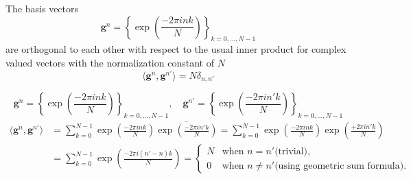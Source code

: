 \begin{Prop}\label{Prop:1ddftbasisvectors}
    The basis vectors
    \begin{equation}\label{eq:1ddftbasisvectors}
        \boldsymbol{g}^n = \left\{\exp\left({\frac{-2\pi ink}{N}}\right)\right\}_{k=0,\ldots,N-1}
    \end{equation}
    are orthogonal to each other with respect to the usual inner product for complex valued vectors 
    with the normalization constant of $N$
    \begin{equation}
        \langle\boldsymbol{g}^n,\boldsymbol{g}^{n'}\rangle= N \delta_{n,n'}
    \end{equation}
\end{Prop}

\begin{Proof}
    \begin{equation*}
        \boldsymbol{g}^n = \left\{\exp\left({\frac{-2\pi ink}{N}}\right)\right\}_{k=0,\ldots,N-1}, \quad \boldsymbol{g}^{n'} = \left\{\exp\left({\frac{-2\pi in'k}{N}}\right)\right\}_{k=0,\ldots,N-1}
    \end{equation*}
    \begin{equation*}
    \begin{split} 
        \langle\boldsymbol{g}^n,\boldsymbol{g}^{n'}\rangle &= \sum_{k=0}^{N-1} \exp\left({\frac{-2\pi ink}{N}}\right)\overline{\exp\left({\frac{-2\pi in'k}{N}}\right)}
        = \sum_{k=0}^{N-1} \exp\left({\frac{-2\pi ink}{N}}\right)\exp\left({\frac{+2\pi in'k}{N}}\right)\\
        &= \sum_{k=0}^{N-1} \exp\left({\frac{-2\pi i(n'-n)k}{N}}\right)=
        \begin{cases}
            N & \text{when $n = n'$}\text{(trivial)},\\
            0 & \text{when $n\neq n'$}\text{(using geometric sum formula)}.
        \end{cases}
    \end{split}
\end{equation*}
    
\end{Proof}


